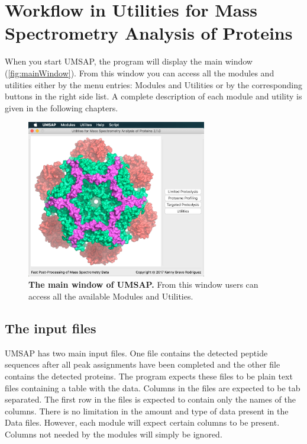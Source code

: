 \chapter{Workflow in Utilities for Mass Spectrometry Analysis of Proteins}
\label{chap:workflow}

When you start UMSAP, the program will display the main window (\autoref{fig:mainWindow}).
From this window you can access all the modules and utilities either by the menu entries: Modules and Utilities or by the corresponding buttons in the right side list. A complete description of each module and utility is given in the following chapters.

\begin{figure}[h]
	\centering
	\includegraphics[width=0.7\textwidth]{./IMAGES/MAIN-WINDOW/mainwindow.jpg}	    
	\caption[The main window of UMSAP]{\textbf{The main window of UMSAP.} From this window users can access all the available Modules and Utilities.} 
	\label{fig:mainWindow}
	\vspace{-5pt} 	
\end{figure}  

\section{The input files}
\label{sec:dataFile}

UMSAP has two main input files. One file contains the detected peptide sequences after all peak assignments have been completed and the other file contains the detected proteins. The program expects these files to be plain text files containing a table with the data. Columns in the files are expected to be tab separated. The first row in the files is expected to contain only the names of the columns. There is no limitation in the amount and type of data present in the Data files. However, each module will expect certain columns to be present. Columns not needed by the modules will simply be ignored.

